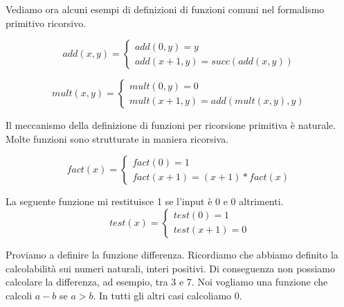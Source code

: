 Vediamo ora alcuni esempi di definizioni di funzioni comuni nel formalismo primitivo ricorsivo.

\begin{equation*}
    \textit{add}(x,y) = 
    \begin{cases}
        \textit{add}(0,y) = y \\
        \textit{add}(x+1,y) = \textit{succ}(\textit{add}(x,y))
    \end{cases}
\end{equation*}

\begin{equation*}
    \textit{mult}(x,y) = 
    \begin{cases}
        \textit{mult}(0,y) = 0 \\
        \textit{mult}(x+1,y) = \textit{add}(\textit{mult}(x,y),y)
    \end{cases}
\end{equation*}

Il meccanismo della definizione di funzioni per ricorsione primitiva è naturale. Molte funzioni
sono strutturate in maniera ricorsiva.

\begin{equation*}
    \textit{fact}(x) =
    \begin{cases}
        \textit{fact}(0) = 1 \\
        \textit{fact}(x+1) = (x+1)*\textit{fact}(x)
    \end{cases}
\end{equation*}


La seguente funzione mi restituisce 1 se l'input è 0 e 0 altrimenti.
\begin{equation*}
    \textit{test}(x) = 
    \begin{cases}
        \textit{test}(0) = 1 \\
        \textit{test}(x+1) = 0
    \end{cases}
\end{equation*}

Proviamo a definire la funzione differenza. Ricordiamo che abbiamo definito la calcolabilità sui
numeri naturali, interi positivi. Di conseguenza non possiamo calcolare la differenza, ad esempio,
tra 3 e 7. Noi vogliamo una funzione che calcoli $a - b$ se $a > b$. In tutti gli altri casi
calcoliamo 0.

